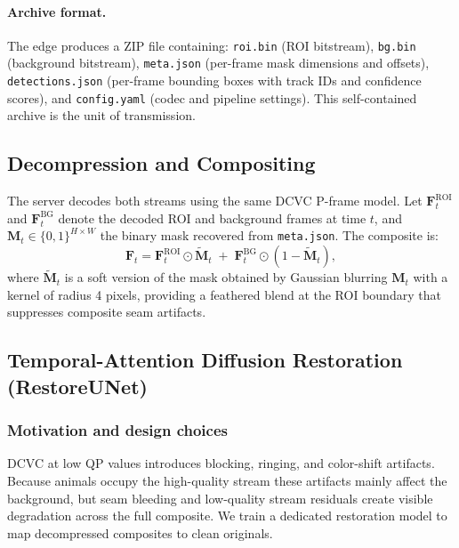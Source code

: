 \documentclass[10pt, conference]{IEEEtran}
\begin{document}
\paragraph{Archive format.}
The edge produces a ZIP file containing: \texttt{roi.bin} (ROI bitstream), \texttt{bg.bin} (background bitstream), \texttt{meta.json} (per-frame mask dimensions and offsets), \texttt{detections.json} (per-frame bounding boxes with track IDs and confidence scores), and \texttt{config.yaml} (codec and pipeline settings). This self-contained archive is the unit of transmission.

\subsection{Decompression and Compositing}
\label{ssec:decompression}

The server decodes both streams using the same DCVC P-frame model. Let $\mathbf{F}^{\text{ROI}}_t$ and $\mathbf{F}^{\text{BG}}_t$ denote the decoded ROI and background frames at time $t$, and $\mathbf{M}_t \in \{0,1\}^{H \times W}$ the binary mask recovered from \texttt{meta.json}. The composite is:
\begin{equation}
\mathbf{F}_t = \mathbf{F}^{\text{ROI}}_t \odot \tilde{\mathbf{M}}_t \;+\; \mathbf{F}^{\text{BG}}_t \odot (1 - \tilde{\mathbf{M}}_t),
\label{eq:composite}
\end{equation}
where $\tilde{\mathbf{M}}_t$ is a soft version of the mask obtained by Gaussian blurring $\mathbf{M}_t$ with a kernel of radius 4 pixels, providing a feathered blend at the ROI boundary that suppresses composite seam artifacts.

\subsection{Temporal-Attention Diffusion Restoration (RestoreUNet)}
\label{ssec:restoration}

\subsubsection{Motivation and design choices}

DCVC at low QP values introduces blocking, ringing, and color-shift artifacts. Because animals occupy the high-quality stream these artifacts mainly affect the background, but seam bleeding and low-quality stream residuals create visible degradation across the full composite. We train a dedicated restoration model to map decompressed composites to clean originals.
\end{document}

